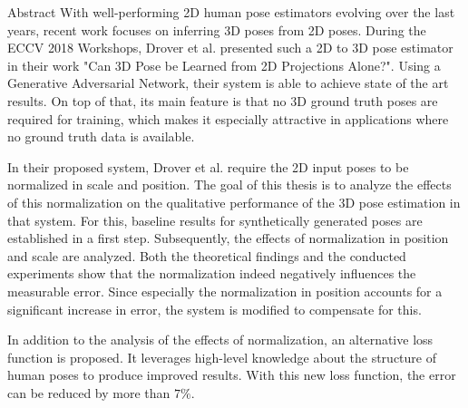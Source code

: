 \begin{polyabstract}{Abstract}
	With well-performing 2D human pose estimators evolving over the last years, recent work focuses on inferring 3D poses from 2D poses.
	During the ECCV 2018 Workshops, Drover et al. presented such a 2D to 3D pose estimator in their work "Can 3D Pose be Learned from 2D Projections Alone?".
	Using a Generative Adversarial Network, their system is able to achieve state of the art results.
	On top of that, its main feature is that no 3D ground truth poses are required for training, which makes it especially attractive in applications where no ground truth data is available.
	
	In their proposed system, Drover et al. require the 2D input poses to be normalized in scale and position.
	The goal of this thesis is to analyze the effects of this normalization on the qualitative performance of the 3D pose estimation in that system.
	For this, baseline results for synthetically generated poses are established in a first step.
	Subsequently, the effects of normalization in position and scale are analyzed.
	Both the theoretical findings and the conducted experiments show that the normalization indeed negatively influences the measurable error.
	Since especially the normalization in position accounts for a significant increase in error, the system is modified to compensate for this.
	
	In addition to the analysis of the effects of normalization, an alternative loss function is proposed.
	It leverages high-level knowledge about the structure of human poses to produce improved results.
	With this new loss function, the error can be reduced by more than $7\%$. 
	
\end{polyabstract}

